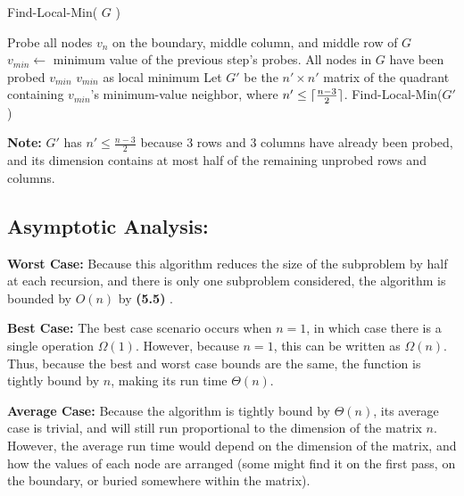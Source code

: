 \documentclass{article}
\DeclarePairedDelimiter{\ceil}{\lceil}{\rceil}
\begin{document}
\begin{algorithm}
\caption{Find-Local-Min( $G$ )}
\begin{algorithmic}
\State Probe all nodes $v_n$ on the boundary, middle column, and middle row of $G$
\State $v_{min} \gets$ minimum value of the previous step's probes.
	\State All nodes in $G$ have been probed
	\State \Return $v_{min}$
\Else
		\State \Return $v_{min}$ as local minimum
	\Else
		\State Let $G'$ be the $n' \times n'$ matrix of the quadrant containing $v_{min}$'s minimum-value neighbor, where 
		$n' \leq \ceil{ \frac{n-3}{2}}$.
		\State Find-Local-Min($G'$)
	\EndIf
\EndIf
\end{algorithmic}
\end{algorithm}

\textbf{Note:} $G'$ has $n' \leq \frac{n-3}{2}$ because 3 rows and 3 columns have already been probed, and its dimension contains at most half of the remaining unprobed rows and columns.
 
\subsection*{Asymptotic Analysis:}
\noindent \textbf{Worst Case:}
Because this algorithm reduces the size of the subproblem by half at each recursion, and there is only one subproblem considered, the algorithm is bounded by $O(n)$ by \textbf{(5.5)} \cite{algDesign}.
 
\noindent \textbf{Best Case:}
The best case scenario occurs when $n = 1$, in which case there is a single operation $\Omega(1)$.  However, because $n=1$, this can be written as $\Omega(n)$.  Thus, because the best and worst case bounds are the same, the function is tightly bound by $n$, making its run time $\Theta(n)$.
  
\noindent \textbf{Average Case:}
Because the algorithm is tightly bound by $\Theta(n)$, its average case is trivial, and will still run proportional to the dimension of the matrix $n$.  However, the average run time would depend on the dimension of the matrix, and how the values of each node are arranged (some might find it on the first pass, on the boundary, or buried somewhere within the matrix).
\end{document}
